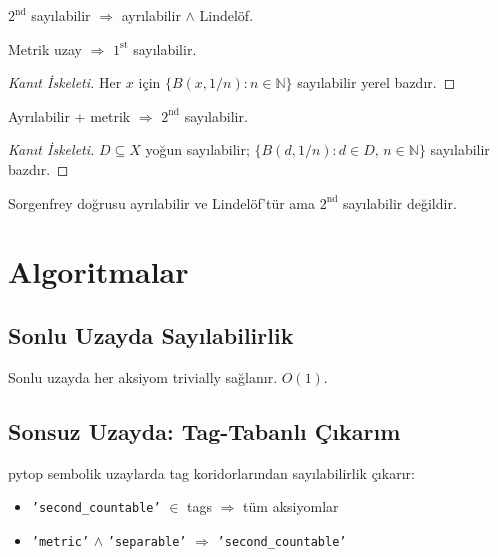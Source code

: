 \begin{theorem}
$2^{\text{nd}}$ sayılabilir $\Rightarrow$ ayrılabilir $\wedge$ Lindelöf.
\end{theorem}

\begin{theorem}
Metrik uzay $\Rightarrow$ $1^{\text{st}}$ sayılabilir.
\begin{proof}[Kanıt İskeleti]
Her $x$ için $\{B(x, 1/n) : n \in \mathbb{N}\}$ sayılabilir yerel bazdır.
\end{proof}
\end{theorem}

\begin{theorem}
Ayrılabilir + metrik $\Rightarrow$ $2^{\text{nd}}$ sayılabilir.
\begin{proof}[Kanıt İskeleti]
$D \subseteq X$ yoğun sayılabilir; $\{B(d, 1/n) : d \in D,\, n \in \mathbb{N}\}$ sayılabilir bazdır.
\end{proof}
\end{theorem}

\begin{theorem}
Sorgenfrey doğrusu ayrılabilir ve Lindelöf'tür ama $2^{\text{nd}}$ sayılabilir değildir.
\end{theorem}

\section{Algoritmalar}

\subsection{Sonlu Uzayda Sayılabilirlik}

Sonlu uzayda her aksiyom trivially sağlanır. $O(1)$.

\subsection{Sonsuz Uzayda: Tag-Tabanlı Çıkarım}

pytop sembolik uzaylarda tag koridorlarından sayılabilirlik çıkarır:
\begin{itemize}
  \item \texttt{'second\_countable'} $\in$ tags $\Rightarrow$ tüm aksiyomlar
  \item \texttt{'metric'} $\wedge$ \texttt{'separable'} $\Rightarrow$ \texttt{'second\_countable'}
\end{itemize}

